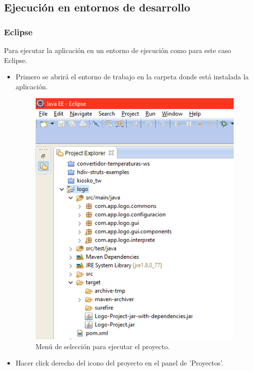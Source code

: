 \subsection{Ejecución en entornos de desarrollo}
\subsubsection{Eclipse}

Para ejecutar la aplicación en un entorno de ejecución como para este caso Eclipse.

\begin{itemize}
	\item Primero se abrirá el entorno de trabajo en la carpeta donde está instalada la aplicación.

	\begin{figure}[H]
		\begin{center}
			\includegraphics[scale=.4]{images/ejecucion_entorno/eclipse/img_eclipse_0}
			\caption{Menú de selección para ejecutar el proyecto.}
		\end{center}
	\end{figure}
	
	\item Hacer click derecho del icono del proyecto en el panel de 'Proyectos'.
	

\end{itemize}
